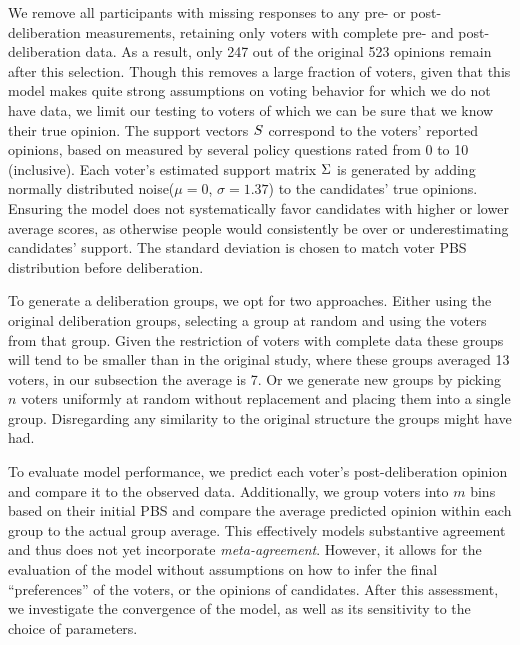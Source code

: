 We remove all participants with missing responses to any pre- or
post-deliberation measurements, retaining only voters with complete pre- and
post-deliberation data. As a result, only 247 out of the original 523 opinions
remain after this selection. Though this removes a large fraction of voters,
given that this model makes quite strong assumptions on voting behavior for
which we do not have data, we limit our testing to voters of which we can be
sure that we know their true opinion. The support vectors $S$ correspond
to the voters' reported opinions, based on measured by several policy questions
rated from 0 to 10 (inclusive). Each voter's estimated support matrix
$\Sigma$ is generated by adding normally distributed noise($\mu=0$,
$\sigma=1.37$) to the candidates' true opinions. Ensuring the model does not
systematically favor candidates with higher or lower average scores, as
otherwise people would consistently be over or underestimating candidates'
support. The standard deviation is chosen to match voter PBS distribution
before deliberation.


To generate a deliberation groups, we opt for two approaches. Either using the
original deliberation groups, selecting a group at random and using the voters
from that group. Given the restriction of voters with complete data these
groups will tend to be smaller than in the original study, where these groups
averaged 13 voters, in our subsection the average is 7. Or we generate new
groups by picking $n$ voters uniformly at random without replacement and
placing them into a single group. Disregarding any similarity to the original
structure the groups might have had.

To evaluate model performance, we predict each voter's post-deliberation
opinion and compare it to the observed data. Additionally, we group voters into
$m$ bins based on their initial PBS and compare the average predicted opinion
within each group to the actual group average. This effectively models
substantive agreement and thus does not yet incorporate \textit{meta-agreement}.
However, it allows for the evaluation of the model without assumptions on how
to infer the final ``preferences'' of the voters, or the opinions of
candidates. After this assessment, we investigate the convergence of the model,
as well as its sensitivity to the choice of parameters.


